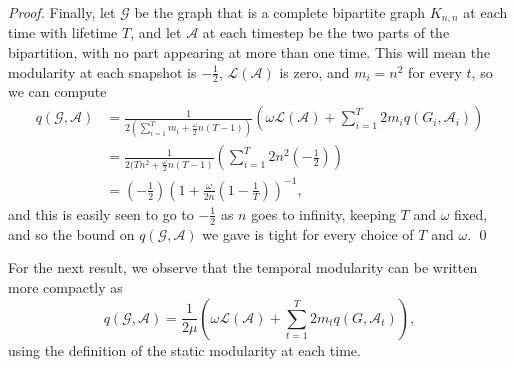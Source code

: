 \documentclass[runningheads]{llncs}
\newcommand{\cA}{\mathcal{A}}
\newcommand{\cG}{\mathcal{G}}
\newcommand{\loy}{\mathcal{L}}
\begin{document}
\begin{proof}
    Finally, let $\cG$ be the graph that is a complete bipartite graph $K_{n,n}$ at each time with lifetime $T$, and let $\cA$ at each timestep be the two parts of the bipartition, with no part appearing at more than one time. This will mean the modularity at each snapshot is $-\frac{1}{2}$, $\loy(\cA)$ is zero, and $m_i = n^2$ for every $t$, so we can compute
    \begin{align*}
        q(\cG,\cA) &= \frac{1}{2\left(\sum_{i=1}^T m_i + \frac{\omega}{2}n(T-1)\right)}\left(\omega \loy(\cA) + \sum_{i=1}^T 2m_iq(G_i,\cA_i)\right)\\
        &= \frac{1}{2(Tn^2 + \frac{\omega}{2}n(T-1)}\left(\sum_{i=1}^T 2n^2\left(-\frac{1}{2}\right)\right)\\
        &= \left(-\frac{1}{2}\right)\left(1 + \frac{\omega}{2n}\left(1 - \frac{1}{T}\right)\right)^{-1},
    \end{align*}
    and this is easily seen to go to $-\frac{1}{2}$ as $n$ goes to infinity, keeping $T$ and $\omega$ fixed, and so the bound on $q(\cG,\cA)$ we gave is tight for every choice of $T$ and $\omega$.
    \qed
\end{proof}

For the next result, we observe that the temporal modularity can be written more compactly as
\begin{equation}\label{eqn:temp_mod_as_sum_of_static_mod}
    q(\cG, \cA) = \frac{1}{2\mu}\left(\omega \loy(\cA) + \sum_{t=1}^T 2m_tq(G, \cA_t)\right),
\end{equation}
using the definition of the static modularity at each time.
\end{document}
